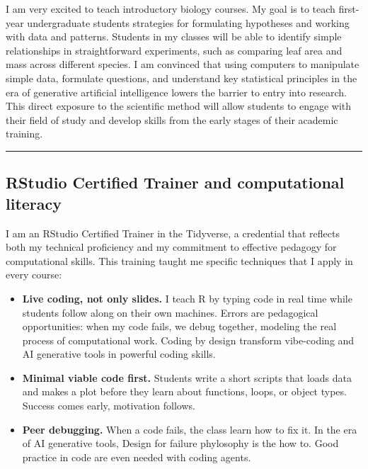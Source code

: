 \documentclass[11pt,letterpaper]{article}
\providecommand{\tightlist}{\setlength{\itemsep}{0pt}\setlength{\parskip}{0pt}}
\begin{document}
I am very excited to teach introductory biology courses. My goal is to teach first-year undergraduate students strategies for formulating hypotheses and working with data and patterns. Students in my classes will be able to identify simple relationships in straightforward experiments, such as comparing leaf area and mass across different species. I am convinced that using computers to manipulate simple data, formulate questions, and understand key statistical principles in the era of generative artificial intelligence lowers the barrier to entry into research. This direct exposure to the scientific method will allow students to engage with their field of study and develop skills from the early stages of their academic training.
\begin{center}\rule{0.5\linewidth}{0.5pt}\end{center}

\subsection*{RStudio Certified Trainer and computational
literacy}\label{rstudio-certified-trainer-and-computational-literacy}

I am an RStudio Certified Trainer in the Tidyverse, a credential that
reflects both my technical proficiency and my commitment to effective
pedagogy for computational skills. This training taught me specific
techniques that I apply in every course:

\begin{itemize}
\tightlist
\item
  \textbf{Live coding, not only slides.} I teach R by typing code in real time while students follow along on their own machines. Errors are pedagogical opportunities: when my code fails, we debug together,
  modeling the real process of computational work. 
  Coding by design transform vibe-coding and AI generative tools
  in powerful coding skills.
\item
  \textbf{Minimal viable code first.} Students write a short scripts
  that loads data and makes a plot before they learn about functions,
  loops, or object types. Success comes early, motivation follows.
\item
  \textbf{Peer debugging.} When a code fails, the class learn how 
  to fix it. In the era of AI generative tools, Design for failure 
  phylosophy is the how to. Good practice in code are even needed
  with coding agents. 
\end{itemize}
\end{document}
